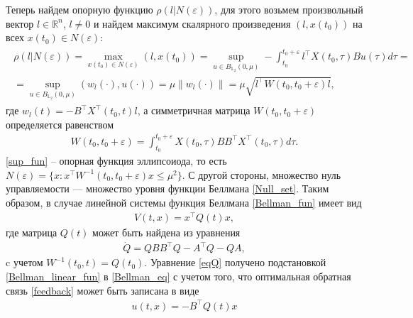 \documentclass[12pt,a4paper,twoside]{article}  %
\begin{document}
 Теперь найдем опорную функцию $ \rho(l|N(\varepsilon))$, для этого возьмем произвольный вектор  $l \in \mathbb{R}^n$, $ l \neq 0 $ и найдем максимум скалярного произведения $ (l,x(t_0)) $ на всех $x(t_0) \in N(\varepsilon)$:
 \begin{gather}\label{sup_fun}
 	\begin{gathered}
 			\rho(l|N(\varepsilon)) = \max\limits_{x(t_0) \in N(\varepsilon)} (l,x(t_0))  = \sup\limits_{u \in B_{\mathbb{L}_2}(0,\mu)} -\int_{t_0}^{t_0+\varepsilon} l^{\top}X(t_0,\tau) B u(\tau) d\tau =\\=  \sup\limits_{u \in B_{\mathbb{L}_2}(0,\mu)} (w_l(\cdot),u(\cdot)) = \mu \| w_l(\cdot)\| = \mu \sqrt{l^{\top} W(t_0,t_0+\varepsilon) l},
 	\end{gathered}
 \end{gather}
где $ w_l(t) = -B^{\top}X^{\top}(t_0,t) l$, а симметричная матрица $ W(t_0,t_0+\varepsilon) $ определяется равенством
\begin{gather}\label{W}
	W(t_0,t_0+\varepsilon) = \int_{t_0}^{t_0+\varepsilon} X(t_0,\tau) B B^{\top} X^{\top} (t_0,\tau) d\tau.
\end{gather}
\eqref{sup_fun} -- опорная функция эллипсоиода, то есть $ N(\varepsilon) = \{x: x^{\top} W^{-1}(t_0,t_0+\varepsilon)x \leqslant \mu^2\}$. С другой стороны, множество нуль управляемости --- множество уровня функции Беллмана \eqref{Null_set}. Таким образом, в случае линейной системы функция Беллмана \eqref{Bellman_fun} имеет вид
\begin{gather}\label{Bellman_linear_fun}
	V(t,x) = x^{\top} Q(t) x,
\end{gather}
где матрица  $ Q(t) $ может быть найдена из уравнения 
\begin{gather}\label{eqQ}
	\dot{Q}  = Q B B^{\top} Q - A^{\top}Q - Q A,
\end{gather}
c учетом $ W^{-1}(t_0,t) = Q(t_0) $.
Уравнение \eqref{eqQ} получено подстановкой \eqref{Bellman_linear_fun} в \eqref{Bellman_eq} с учетом того, что оптимальная обратная связь \eqref{feedback} может быть записана в виде
\begin{gather}\label{linear_feedback}
	u(t,x) = -B^{\top} Q(t) x
\end{gather}
\end{document}
